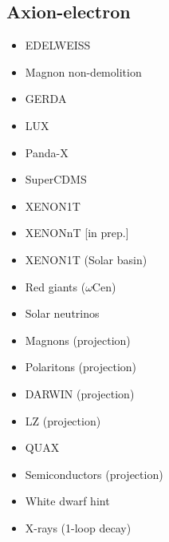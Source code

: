 \documentclass[11pt,twocolumn]{extarticle}
\begin{document}
\newpage

\begin{mdframed}
\vspace{-1em}
\section{Axion-electron}\vspace{-0.5em}
\begin{itemize}\setlength\itemsep{-0.5em}
    \item EDELWEISS~\cite{EDELWEISS:2018tde}
    \item Magnon non-demolition~\cite{Ikeda:2021mlv}
    \item GERDA~\cite{GERDA:2020emj}
    \item LUX~\cite{LUX:2017glr}
    \item Panda-X~\cite{PandaX:2017ock}
    \item SuperCDMS~\cite{SuperCDMS:2019jxx}
    \item XENON1T~\cite{XENON:2019gfn,XENON:2020rca}
    \item XENONnT [in prep.]
    \item XENON1T (Solar basin)~\cite{VanTilburg:2020jvl}
    \item Red giants ($\omega$Cen)~\cite{Capozzi:2020cbu}
    \item Solar neutrinos~\cite{Gondolo:2008dd}
    \item Magnons (projection)~\cite{Chigusa:2020gfs}
        \item Polaritons (projection)~\cite{Mitridate:2020kly}
    \item DARWIN (projection)~\cite{DARWIN:2016hyl}
    \item LZ (projection)~\cite{LZ:2021xov}
    \item QUAX~\cite{Crescini:2018qrz,QUAX:2020adt}
  	\item Semiconductors (projection)~\cite{Bloch:2016sjj}
  	\item White dwarf hint~\cite{Giannotti:2017hny}
  	\item X-rays (1-loop decay)~\cite{Ferreira:2022egk}
\end{itemize}
\end{mdframed}
\end{document}
